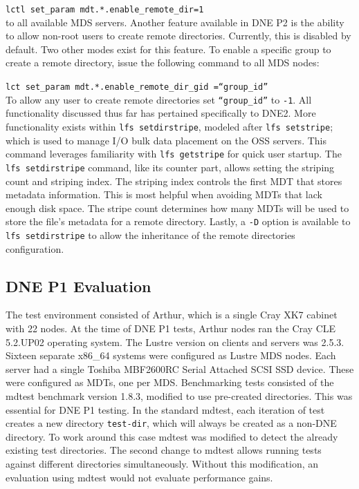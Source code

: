 \documentclass[conference,compsoc]{IEEEtran}
\begin{document}
{\footnotesize{\texttt{lctl set\_param mdt.*.enable\_remote\_dir=1}}}
\\
to all available MDS servers. Another feature available in DNE P2 is the
ability to allow non-root users to create remote directories. Currently, this
is disabled by default. Two other modes exist for this feature. To enable a
specific group to create a remote directory, issue the following command
to all MDS nodes:

{\footnotesize{\texttt{{lct set\_param mdt.*.enable\_remote\_dir\_gid
=``group\_id''}}}} 
\\
To allow any user to create remote directories set {\footnotesize{\texttt{``group\_id''}}} 
to {\footnotesize{\texttt{-1}}}. All functionality discussed thus far has pertained
specifically to DNE2. More functionality exists within {\footnotesize{\texttt{lfs setdirstripe}}},
modeled after {\footnotesize{\texttt{lfs setstripe}}}; which is used to manage I/O bulk data
placement on the OSS servers. This command leverages familiarity with
{\footnotesize{\texttt{lfs getstripe}}} for quick user startup. The 
{\footnotesize{\texttt{{lfs setdirstripe}}}}  command, like its counter part, allows
setting the striping count and striping index. The striping index controls the first
MDT that stores metadata information. This is most helpful when avoiding MDTs
that lack enough disk space. The stripe count determines how many MDTs
will be used to store the file's metadata for a remote directory. Lastly,
a {\footnotesize{\texttt{{-D}}}} option is available to {\footnotesize{\texttt{{lfs setdirstripe}}}} to allow the inheritance of the
remote directories configuration.


\subsection{DNE P1 Evaluation}

The test environment consisted of Arthur, which is a single Cray XK7 cabinet with
22 nodes. At the time of DNE P1 tests, Arthur nodes ran the Cray CLE 5.2.UP02
operating system. The Lustre version on clients and servers was 2.5.3. Sixteen separate x86\_64
systems were configured as Lustre MDS nodes. 
Each server had a single Toshiba MBF2600RC Serial Attached SCSI
SSD device. These were configured as MDTs, one per MDS.  Benchmarking tests
consisted of the mdtest benchmark version 1.8.3, modified to use pre-created
directories. This was essential for DNE P1 testing. 
In the standard mdtest, each iteration of test creates a new
directory {\footnotesize{\texttt{test-dir}}}, which will always be created as
a non-DNE directory. To
work around this case mdtest was modified to detect the already existing
test directories. The second change to mdtest allows running tests against
different directories simultaneously. Without this modification, an evaluation
using mdtest would not evaluate performance gains.
\end{document}
